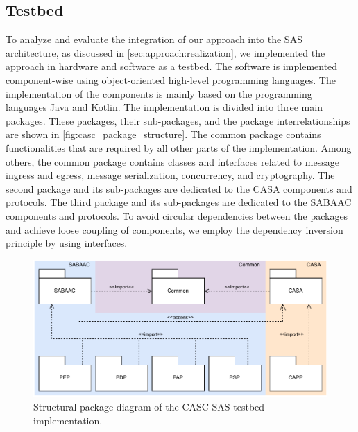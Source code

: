 \subsection{Testbed}
To analyze and evaluate the integration of our approach into the SAS architecture, as discussed in \autoref{sec:approach:realization}, we implemented the approach in hardware and software as a testbed.
The software is implemented component-wise using object-oriented high-level programming languages.
The implementation of the components is mainly based on the programming languages Java and Kotlin.
The implementation is divided into three main packages.
These packages, their sub-packages, and the package interrelationships are shown in \autoref{fig:casc_package_structure}.
The common package contains functionalities that are required by all other parts of the implementation.
Among others, the common package contains classes and interfaces related to message ingress and egress, message serialization, concurrency, and cryptography.
The second package and its sub-packages are dedicated to the CASA components and protocols.
The third package and its sub-packages are dedicated to the SABAAC components and protocols.
To avoid circular dependencies between the packages and achieve loose coupling of components, we employ the dependency inversion principle by using interfaces.
\begin{figure}
    \centering
    \includegraphics[width=0.9\linewidth]{figures/package_structure.drawio.pdf}
    \caption{Structural package diagram of the CASC-SAS testbed implementation.}
    \label{fig:casc_package_structure}
\end{figure}

